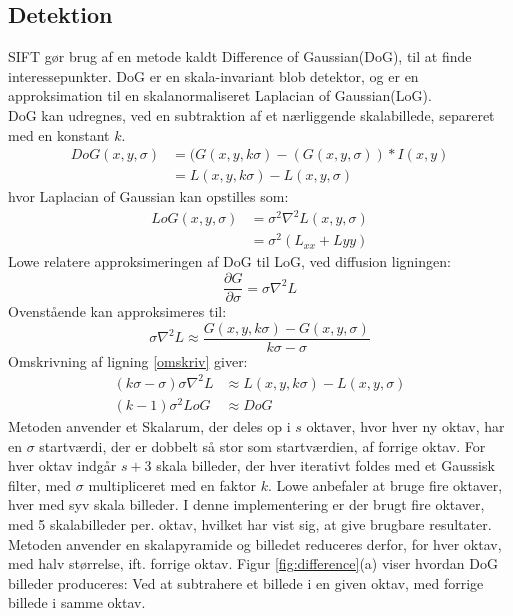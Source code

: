\subsection{Detektion}
SIFT gør brug af en metode kaldt Difference of Gaussian(DoG), til at finde interessepunkter. DoG er en skala-invariant blob detektor, og er en approksimation til en skalanormaliseret Laplacian of Gaussian(LoG). \\ DoG kan udregnes, ved en subtraktion af et nærliggende skalabillede, separeret med en konstant $k$.
\begin{equation}
\begin{split}
DoG(x,y,\sigma) &= (G(x,y,k\sigma)-(G(x,y,\sigma))\ast I(x,y) \\
           &= L(x,y,k \sigma)-L(x,y,\sigma)
\end{split}
\end{equation}
hvor Laplacian of Gaussian kan opstilles som:
\begin{equation}
\begin{split}
LoG(x,y,\sigma)&=\sigma^2\nabla^2L(x,y,\sigma) \\
&= \sigma^2(L_{xx}+L{yy})
\end{split}
\end{equation}
Lowe relatere approksimeringen af DoG til LoG, ved diffusion ligningen:
\begin{equation}
\dfrac{\partial G}{\partial \sigma} = \sigma \nabla^2L
\label{heat}
\end{equation}
Ovenstående kan approksimeres til:
\begin{equation}
\sigma \nabla^2L \approx \frac{G(x,y,k\sigma) - G(x,y,\sigma)}{k\sigma-\sigma}
\label{omskriv}
\end{equation}
Omskrivning af ligning \eqref{omskriv} giver:
\begin{equation}
\begin{split}
(k\sigma-\sigma)\sigma\nabla^2L &\approx L(x,y,k\sigma)-L(x,y,\sigma) \\
(k-1)\sigma^2LoG &\approx DoG
\end{split}
\end{equation}
Metoden anvender et Skalarum, der deles op i $s$ oktaver, hvor hver ny oktav, har en $\sigma$ startværdi, der er dobbelt så stor som startværdien, af forrige oktav. For hver oktav indgår $s+3$ skala billeder, der hver iterativt foldes med et Gaussisk filter, med $\sigma$ multipliceret med en faktor $k$. Lowe anbefaler at bruge fire oktaver, hver med syv skala billeder. I denne implementering er der brugt fire oktaver, med 5 skalabilleder per. oktav, hvilket har vist sig, at give brugbare resultater. Metoden anvender en skalapyramide og billedet reduceres derfor, for hver oktav, med halv størrelse, ift. forrige oktav. Figur \ref{fig:difference}(a) viser hvordan DoG billeder produceres: Ved at subtrahere et billede i en given oktav, med forrige billede i samme oktav.
